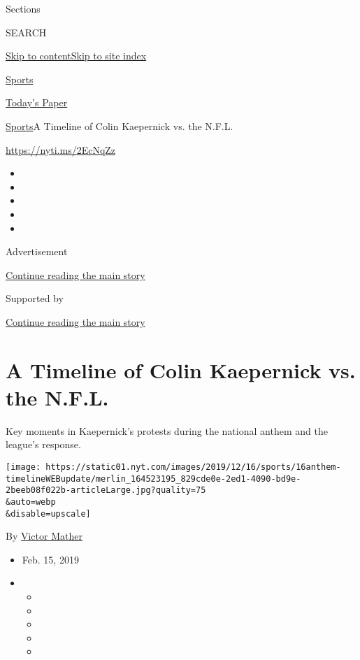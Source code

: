 Sections

SEARCH

\protect\hyperlink{site-content}{Skip to
content}\protect\hyperlink{site-index}{Skip to site index}

\href{https://www.nytimes.com/section/sports}{Sports}

\href{https://myaccount.nytimes.com/auth/login?response_type=cookie\&client_id=vi}{}

\href{https://www.nytimes.com/section/todayspaper}{Today's Paper}

\href{/section/sports}{Sports}\textbar{}A Timeline of Colin Kaepernick
vs. the N.F.L.

\url{https://nyti.ms/2EcNqZz}

\begin{itemize}
\item
\item
\item
\item
\item
\end{itemize}

Advertisement

\protect\hyperlink{after-top}{Continue reading the main story}

Supported by

\protect\hyperlink{after-sponsor}{Continue reading the main story}

\hypertarget{a-timeline-of-colin-kaepernick-vs-the-nfl}{%
\section{A Timeline of Colin Kaepernick vs. the
N.F.L.}\label{a-timeline-of-colin-kaepernick-vs-the-nfl}}

Key moments in Kaepernick's protests during the national anthem and the
league's response.

\texttt{[image: https://static01.nyt.com/images/2019/12/16/sports/16anthem-timelineWEBupdate/merlin\_164523195\_829cde0e-2ed1-4090-bd9e-2beeb08f022b-articleLarge.jpg?quality=75\\\&auto=webp\\\&disable=upscale]}

By \href{https://www.nytimes.com/by/victor-mather}{Victor Mather}

\begin{itemize}
\item
  Feb. 15, 2019
\item
  \begin{itemize}
  \item
  \item
  \item
  \item
  \item
  \end{itemize}
\end{itemize}

